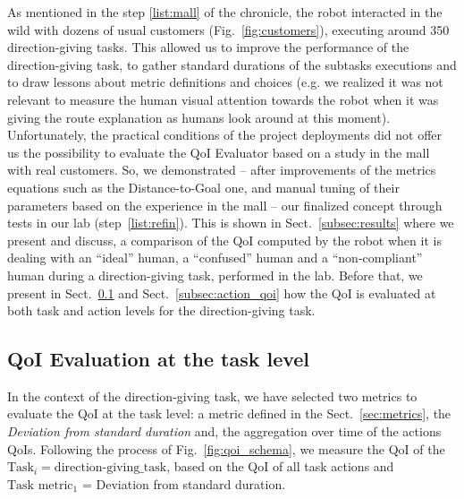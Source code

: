 \documentclass[a4paper,11pt,twoside]{StyleThese}
\begin{document}
As mentioned in the step \ref{list:mall} of the chronicle, the robot interacted in the wild with dozens of usual customers (Fig.~\ref{fig:customers}), executing around 350 direction-giving tasks. This allowed us to improve the performance of the direction-giving task, to gather standard durations of the subtasks executions and to draw lessons about metric definitions and choices (e.g. we realized it was not relevant to measure the human visual attention towards the robot when it was giving the route explanation as humans look around at this moment). Unfortunately, the practical conditions of the project deployments did not offer us the possibility to evaluate the QoI Evaluator based on a study in the mall with real customers. So, we demonstrated -- after improvements of the metrics equations such as the Distance-to-Goal one, and manual tuning of their parameters based on the experience in the mall -- our finalized concept through tests in our lab (step~\ref{list:refin}). This is shown in Sect.~\ref{subsec:results} where we present and discuss, a comparison of the QoI computed by the robot when it is dealing with an ``ideal'' human, a ``confused'' human and a ``non-compliant'' human during a direction-giving task, performed in the lab. Before that, we present in Sect.~\ref{subsec:task_qoi} and Sect.~\ref{subsec:action_qoi} how the QoI is evaluated at both task and action levels for the direction-giving task.

\subsection{QoI Evaluation at the task level}\label{subsec:task_qoi}

In the context of the direction-giving task, we have selected two metrics to evaluate the QoI at the task level: a metric defined in the Sect.~\ref{sec:metrics}, the \textit{Deviation from standard duration} and, the aggregation over time of the actions QoIs. Following the process of Fig.~\ref{fig:qoi_schema}, we measure the QoI of the $\text{Task}_i = \text{direction-giving\_task}$, based on the QoI of all task actions and $\text{Task metric}_1$ = Deviation from standard duration.
\end{document}
